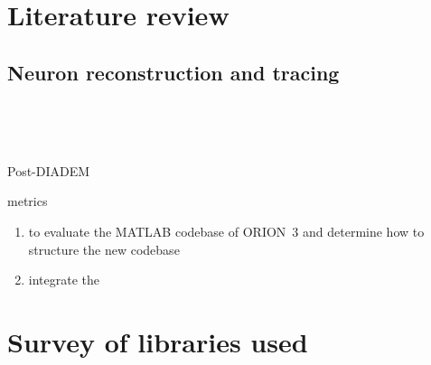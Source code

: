 \section{Literature review}

\subsection{Neuron reconstruction and tracing}\label{subsec:neuron-tracing}

~\autocite{Duke-Southampton-archive:Cannon:1998,DIADEM-dataset:Brown:2011}

~\autocite{DIADEM&Beyond:Liu:2011,NeuroMorphTrends:Halavi:2012,NeuroTracePerspect:Meijering:2010}

Post-DIADEM
~\autocite{Bauer2010,MIA-anisotropic-path-searching-Xie2011,MICCAI-anisotropic-path-searching-Xie2010,
Jeong2015,Luo2015,De2015,Gulyanon2015,ORION_Santamaria-Pang2015,Mukherjee2014,Hernandez-Herrera2014,Basu2014,Xiao2013,Jimenez2013,Basu2013,Mukherjee2013,Hernandez-Herrera2013,Ming2013,Lee2012,Czarnecki2012}

metrics~\autocite{Mayerich2011,Mayerich2012,btmorph-Torben-Nielsen2014,Costa2014,Gillette2015}

\begin{enumerate}[label=(\roman*)]
\item to evaluate the MATLAB codebase of \acrshort{ORION}~3 and determine how to structure the new codebase
\item integrate the
\end{enumerate}

%

\section{Survey of libraries used}


